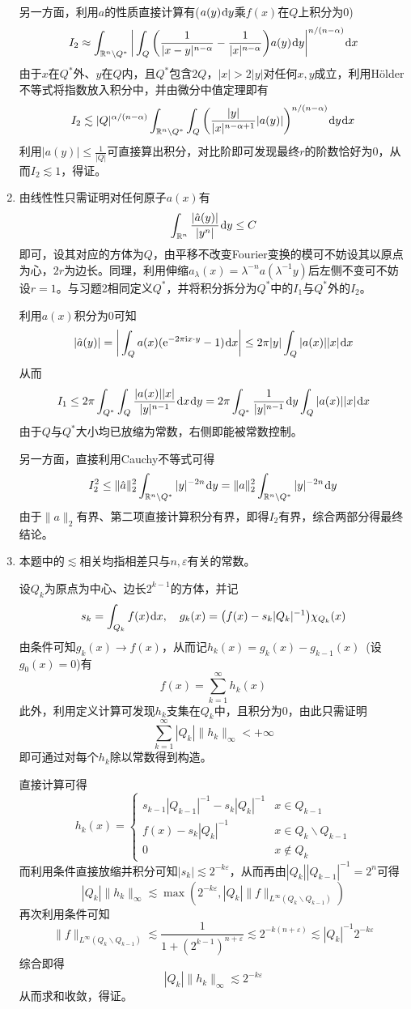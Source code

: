 \documentclass[a4paper,UTF8,fontset=windows]{ctexart}
\newcommand*{\er}{\mathrm{e}}
\newcommand*{\ir}{\mathrm{i}}
\newcommand*{\dr}{\hspace{0.07em}\mathrm{d}}
\begin{document}
\begin{enumerate}
    另一方面，利用$a$的性质直接计算有($a(y)\dr y$乘$f(x)$在$Q$上积分为0)
    $$I_2\approx\int_{\mathbb{R}^n\backslash Q^*}\bigg|\int_Q\bigg(\frac{1}{|x-y|^{n-\alpha}}-\frac{1}{|x|^{n-\alpha}}\bigg)a(y)\dr y\bigg|^{n/(n-\alpha)}\dr x$$
    由于$x$在$Q^*$外、$y$在$Q$内，且$Q^*$包含$2Q$，$|x|>2|y|$对任何$x,y$成立，利用H\"older不等式将指数放入积分中，并由微分中值定理即有
    $$I_2\lesssim|Q|^{\alpha/(n-\alpha)}\int_{\mathbb{R}^n\backslash Q^*}\int_Q\bigg(\frac{|y|}{|x|^{n-\alpha+1}}|a(y)|\bigg)^{n/(n-\alpha)}\dr y\dr x$$
    利用$|a(y)|\le\frac{1}{|Q|}$可直接算出积分，对比阶即可发现最终$r$的阶数恰好为0，从而$I_2\lesssim1$，得证。

    \item 由线性性只需证明对任何原子$a(x)$有
    $$\int_{\mathbb{R}^n}\frac{|\hat{a}(y)|}{|y^n|}\dr y\le C$$即可，设其对应的方体为$Q$，由平移不改变Fourier变换的模可不妨设其以原点为心，$2r$为边长。同理，利用伸缩$a_\lambda(x)=\lambda^{-n}a(\lambda^{-1}y)$后左侧不变可不妨设$r=1$。与习题2相同定义$Q^*$，并将积分拆分为$Q^*$中的$I_1$与$Q^*$外的$I_2$。

    利用$a(x)$积分为0可知
    $$|\hat{a}(y)|=\bigg|\int_Qa(x)(\er^{-2\pi\ir x\cdot y}-1)\dr x\bigg|\le2\pi|y|\int_Q|a(x)||x|\dr x$$
    从而
    $$I_1\le2\pi\int_{Q^*}\int_Q\frac{|a(x)||x|}{|y|^{n-1}}\dr x\dr y=2\pi\int_{Q^*}\frac{1}{|y|^{n-1}}\dr y\int_Q|a(x)||x|\dr x$$
    由于$Q$与$Q^*$大小均已放缩为常数，右侧即能被常数控制。

    另一方面，直接利用Cauchy不等式可得
    $$I_2^2\le\|\hat{a}\|_2^2\int_{\mathbb{R}^n\backslash Q^*}|y|^{-2n}\dr y=\|a\|_2^2\int_{\mathbb{R}^n\backslash Q^*}|y|^{-2n}\dr y$$
    由于$\|a\|_2$有界、第二项直接计算积分有界，即得$I_2$有界，综合两部分得最终结论。

    \item 本题中的$\lesssim$相关均指相差只与$n,\varepsilon$有关的常数。
    
    设$Q_k$为原点为中心、边长$2^{k-1}$的方体，并记
    $$s_k=\int_{Q_k}f(x)\dr x,\quad g_k(x)=\big(f(x)-s_k|Q_k|^{-1}\big)\chi_{Q_k}(x)$$
    由条件可知$g_k(x)\to f(x)$，从而记$h_k(x)=g_k(x)-g_{k-1}(x)$\ (设$g_0(x)=0$)有
    $$f(x)=\sum_{k=1}^\infty h_k(x)$$
    此外，利用定义计算可发现$h_k$支集在$Q_k$中，且积分为0，由此只需证明
    $$\sum_{k=1}^\infty|Q_k|\|h_k\|_\infty<+\infty$$
    即可通过对每个$h_k$除以常数得到构造。

    直接计算可得
    $$h_k(x)=\begin{cases}s_{k-1}|Q_{k-1}|^{-1}-s_k|Q_k|^{-1}&x\in Q_{k-1}\\f(x)-s_k|Q_k|^{-1}&x\in Q_k\backslash Q_{k-1}\\0&x\notin Q_k\end{cases}$$
    而利用条件直接放缩并积分可知$|s_k|\lesssim 2^{-k\varepsilon}$，从而再由$|Q_k||Q_{k-1}|^{-1}=2^n$可得
    $$|Q_k|\|h_k\|_\infty\lesssim\max(2^{-k\varepsilon},|Q_k|\|f\|_{L^\infty(Q_k\backslash Q_{k-1})})$$
    再次利用条件可知
    $$\|f\|_{L^\infty(Q_k\backslash Q_{k-1})}\lesssim\frac{1}{1+(2^{k-1})^{n+\varepsilon}}\lesssim 2^{-k(n+\varepsilon)}\lesssim|Q_k|^{-1}2^{-k\varepsilon}$$
    综合即得
    $$|Q_k|\|h_k\|_\infty\lesssim2^{-k\varepsilon}$$
    从而求和收敛，得证。


\end{enumerate}
\end{document}
